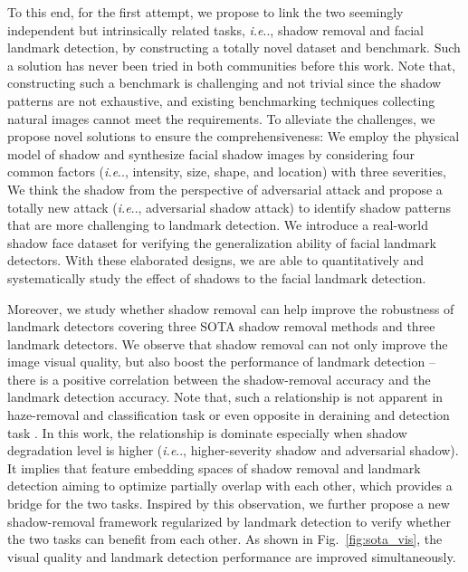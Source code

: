 \documentclass[10pt,twocolumn,letterpaper]{article}
\makeatletter
\newcommand{\figref}[1]{Fig.~\ref{#1}}
\DeclareRobustCommand\onedot{\futurelet\@let@token\@onedot}
\def\@onedot{\ifx\@let@token.\else.\null\fi\xspace}
\def\ie{\emph{i.e}\onedot} \def\Ie{\emph{I.e}\onedot}
\makeatother
\begin{document}
To this end, for the first attempt, we propose to link the two seemingly independent but intrinsically related tasks, \ie, shadow removal and facial landmark detection, by constructing a totally novel dataset and benchmark. Such a solution has never been tried in both communities before this work. 
%
Note that, constructing such a benchmark is challenging and not trivial since the shadow patterns are not exhaustive, and existing benchmarking techniques \cite{sagonas2013300,wu2018look} collecting natural images cannot meet the requirements.
%
To alleviate the challenges, we propose novel solutions to ensure the comprehensiveness:  We employ the physical model of shadow and synthesize facial shadow images by considering four common factors (\ie, intensity, size, shape, and location) with three severities,   We think the shadow from the perspective of adversarial attack and propose a totally new attack (\ie, adversarial shadow attack) to identify shadow patterns that are more challenging to landmark detection.  We introduce a real-world shadow face dataset for verifying the generalization ability of facial landmark detectors. With these elaborated designs, we are able to quantitatively and systematically study the effect of shadows to the facial landmark detection.

Moreover, we study whether shadow removal can help improve the robustness of landmark detectors covering three SOTA shadow removal methods and three landmark detectors. We observe that shadow removal can not only improve the image visual quality, but also boost the performance of landmark detection – there is a positive correlation between the shadow-removal accuracy and the landmark detection accuracy. 
%
Note that, such a relationship is not apparent in haze-removal and classification task \cite{pei2019effects} or even opposite in deraining and detection task \cite{hnewa2020object}.
In this work, the relationship is dominate especially when shadow degradation level is higher (\ie, higher-severity shadow and adversarial shadow). It implies that feature embedding spaces of shadow removal and landmark detection aiming to optimize partially overlap with each other, which provides a bridge for the two tasks.
%
Inspired by this observation, we further propose a new shadow-removal framework regularized by landmark detection to verify whether the two tasks can benefit from each other. As shown in \figref{fig:sota_vis}, the visual quality and landmark detection performance are improved simultaneously.
\end{document}

